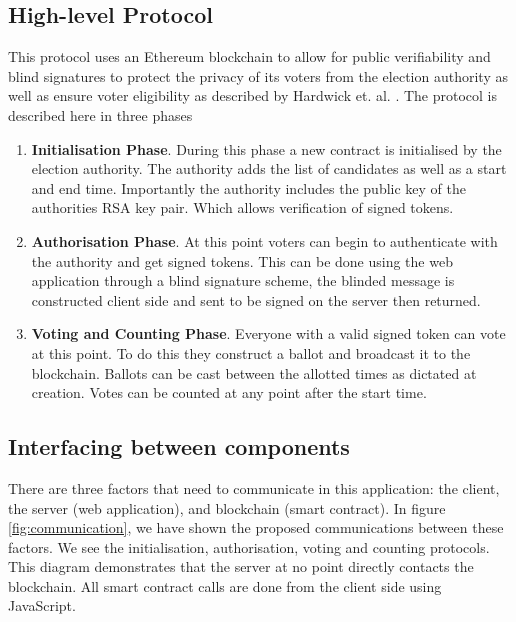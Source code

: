 \documentclass{entcs}
\begin{document}
\subsection{High-level Protocol} 
This protocol uses an Ethereum blockchain to allow for public verifiability and blind signatures to protect the privacy of its voters from the election authority as well as ensure voter eligibility as described by Hardwick et. al. \cite{hardwick2018}. The protocol is described here in three phases
\begin{enumerate}
    \item \textbf{Initialisation Phase}. During this phase a new contract is initialised by the election authority. The authority adds the list of candidates as well as a start and end time. Importantly the authority includes the public key of the authorities RSA key pair. Which allows verification of signed tokens.
    \item \textbf{Authorisation Phase}. At this point voters can begin to authenticate with the authority and get signed tokens. This can be done using the web application through a blind signature scheme, the blinded message is constructed client side and sent to be signed on the server then returned.
    \item \textbf{Voting and Counting Phase}. Everyone with a valid signed token can vote at this point. To do this they construct a ballot and broadcast it to the blockchain. Ballots can be cast between the allotted times as dictated at creation. Votes can be counted at any point after the start time.
\end{enumerate}

\subsection{Interfacing between components}
There are three factors that need to communicate in this application: the client, the server (web application), and blockchain (smart contract). In figure \ref{fig:communication}, we have shown the proposed communications between these factors. We see the initialisation, authorisation, voting and counting protocols. This diagram demonstrates that the server at no point directly contacts the blockchain. All smart contract calls are done from the client side using JavaScript.
\end{document}
